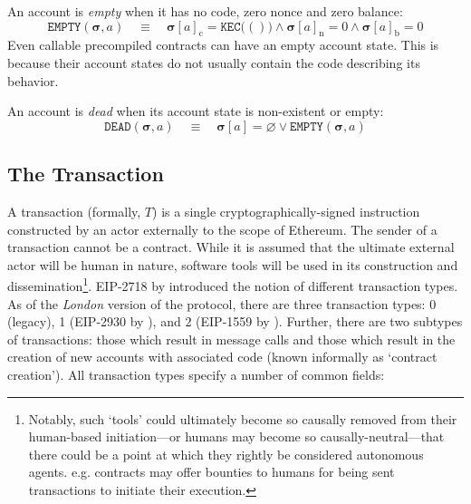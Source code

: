 \documentclass[9pt,oneside]{amsart}
\makeatletter
\newcommand*\eg{e.g.\@\xspace}
\makeatother
\begin{document}
\begin{multicols}{2}
An account is \textit{empty} when it has no code, zero nonce and zero balance:
\begin{equation}
\mathtt{EMPTY}(\boldsymbol{\sigma}, a) \quad\equiv\quad \boldsymbol{\sigma}[a]_{\mathrm{c}} = \texttt{KEC}\big(()\big) \wedge \boldsymbol{\sigma}[a]_{\mathrm{n}} = 0 \wedge \boldsymbol{\sigma}[a]_{\mathrm{b}} = 0
\end{equation}
Even callable precompiled contracts can have an empty account state. This is because their account states do not usually contain the code describing its behavior.

An account is \textit{dead} when its account state is non-existent or empty:
\begin{equation}
\mathtt{DEAD}(\boldsymbol{\sigma}, a) \quad\equiv\quad \boldsymbol{\sigma}[a] = \varnothing \vee \mathtt{EMPTY}(\boldsymbol{\sigma}, a)
\end{equation}

\subsection{The Transaction} \label{subsec:transaction}

A transaction (formally, $T$) is a single cryptographically-signed instruction constructed by an actor externally to the scope of Ethereum.
The sender of a transaction cannot be a contract.
While it is assumed that the ultimate external actor will be human in nature, software tools will be used in its construction and dissemination\footnote{Notably,
such `tools' could ultimately become so causally removed from their human-based initiation---or humans may become so causally-neutral---that there could be a point at which they rightly be considered autonomous agents.
\eg contracts may offer bounties to humans for being sent transactions to initiate their execution.}.
EIP-2718 by \cite{EIP-2718} introduced the notion of different transaction types.
As of the \textit{London} version of the protocol, there are three transaction types: 0 (legacy), 1 (EIP-2930 by \cite{EIP-2930}), and 2 (EIP-1559 by \cite{EIP-1559}).
Further, there are two subtypes of transactions: those which result in message calls and those which result in the creation of new accounts with associated code (known informally as `contract creation').
All transaction types specify a number of common fields:


\end{multicols}
\end{document}
